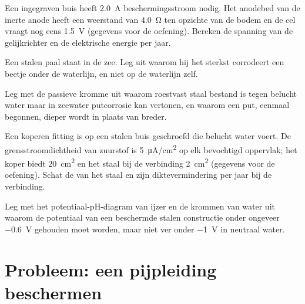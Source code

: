 \begin{exercise}[$\star\star$]\label{exo:b2:corrosion:8}
Een ingegraven buis heeft \qty{2.0}{A} beschermingsstroom nodig. Het anodebed van de
inerte anode heeft een weerstand van \qty{4.0}{\ohm} ten opzichte van de bodem en de cel vraagt
nog eens \qty{1.5}{V} (gegevens voor de oefening). Bereken de spanning van de gelijkrichter en de
elektrische energie per jaar.
\end{exercise}

\begin{exercise}[$\star\star$]\label{exo:b2:corrosion:9}
Een stalen paal staat in de zee. Leg uit waarom hij het sterkst corrodeert een beetje onder
de waterlijn, en niet op de waterlijn zelf.
\end{exercise}

\begin{exercise}[$\star\star\star$]\label{exo:b2:corrosion:10}
Leg met de passieve kromme uit waarom roestvast staal bestand is tegen belucht water maar
in zeewater putcorrosie kan vertonen, en waarom een put, eenmaal begonnen, dieper wordt in plaats van
breder.
\end{exercise}

\begin{exercise}[$\star\star\star$]\label{exo:b2:corrosion:11}
Een koperen fitting is op een stalen buis geschroefd die belucht water voert. De
grensstroomdichtheid van zuurstof is \qty{5}{\micro A/cm^2} op elk bevochtigd oppervlak; het
koper biedt \qty{20}{cm^2} en het staal bij de verbinding \qty{2}{cm^2}
(gegevens voor de oefening). Schat de  van het staal en zijn diktevermindering
per jaar bij de verbinding.
\end{exercise}

\begin{exercise}[$\star\star\star$]\label{exo:b2:corrosion:12}
Leg met het potentiaal-pH-diagram van ijzer en de krommen van water uit waarom de
potentiaal van een beschermde stalen constructie onder ongeveer
\qty{-0.6}{V} gehouden moet worden, maar niet ver onder \qty{-1}{V} in neutraal water.
\end{exercise}

\section{Probleem: een pijpleiding beschermen}

